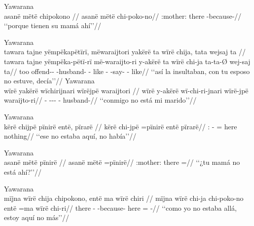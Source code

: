 \documentclass{memoir}
\begin{document}
\ex Yawarana \\
\label{loc-sub-aff-part-nsubj}    \begingl
    \glpreamble asanë mëtë chipokono //
    \gla asanë mëtë chi-poko-no//
    \glb {}:mother: there -because-//
        \glft ‘‘porque tienen su mamá ahí’’//  
    \endgl 
\xe

\pex\label{loc-main-neg-locpred-cop-neg-nsubj}    \a Yawarana\\
    \label{ctorosq-8}        \begingl
        \glpreamble tawara tajne yëmpëkapëtïrï, mëwaraijtori yakërë ta wïrë chija, tata wejsaj ta //
        \gla tawara tajne yëmpëka-pëtï-rï më-waraijto-ri y-akërë ta wïrë chi-ja ta-ta-Ø wej-saj ta//
        \glb too  offend-- -husband- - like  - -say- - like//
            \glft ‘‘así la insultaban, con tu esposo no estuve, decía’’//  
        \endgl 
    \a Yawarana\\
    \label{histpajirdi-81}        \begingl
        \glpreamble wïrë yakërë wïchirijnari wïrëjpë waraijtori //
        \gla wïrë y-akërë wï-chi-ri-jnari wïrë-jpë waraijto-ri//
        \glb {} - --- - husband-//
            \glft ‘‘conmigo no está mi marido’’//  
        \endgl 
\xe

\ex Yawarana \\
\label{loc-main-neg-nsubj-cop-pinire-part}    \begingl
    \glpreamble kërë chijpë pïnirë entë, pïrarë //
    \gla kërë chi-jpë =pïnirë entë pïrarë//
    \glb {}: - = here nothing//
        \glft ‘‘ese no estaba aquí, no había’’//  
    \endgl 
\xe

\ex Yawarana \\
\label{loc-main-neg-part-pinire-nsubj}    \begingl
    \glpreamble asanë mëtë pïnirë //
    \gla asanë mëtë =pïnirë//
    \glb {}:mother: there =//
        \glft ‘‘¿tu mamá no está ahí?’’//  
    \endgl 
\xe

\ex Yawarana \\
\label{loc-sub-neg-locpred-cop-neg-nsubj}    \begingl
    \glpreamble mïjna wïrë chija chipokono, entë ma wïrë chiri //
    \gla mïjna wïrë chi-ja chi-poko-no entë =ma wïrë chi-ri//
    \glb there  - -because- here =  -//
        \glft ‘‘como yo no estaba allá, estoy aquí no más’’//  
    \endgl 
\xe
\end{document}
